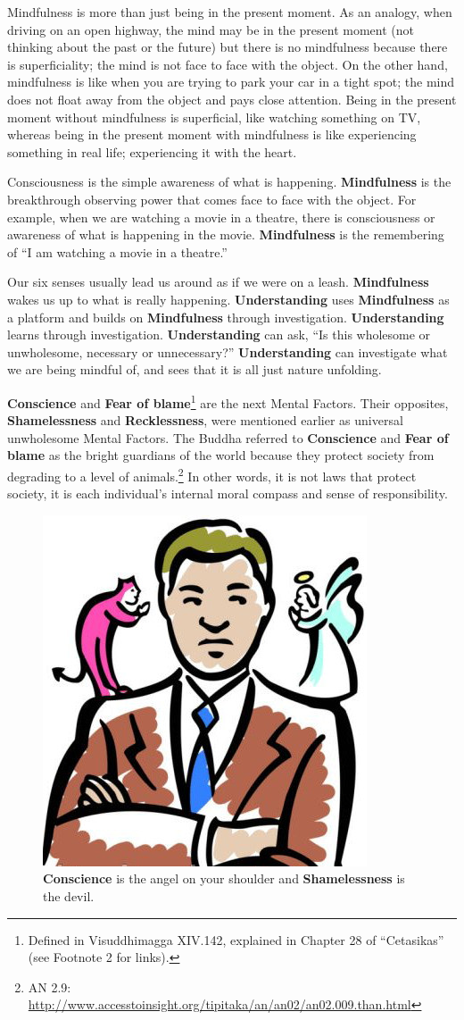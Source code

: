 Mindfulness is more than just being in the present moment. As an analogy, when driving on an open highway, the mind may be in the present moment (not thinking about the past or the future) but there is no mindfulness because there is superficiality; the mind is not face to face with the object. On the other hand, mindfulness is like when you are trying to park your car in a tight spot; the mind does not float away from the object and pays close attention. Being in the present moment without mindfulness is superficial, like watching something on TV, whereas being in the present moment with mindfulness is like experiencing something in real life; experiencing it with the heart.

Consciousness is the simple awareness of what is happening. \textbf{Mindfulness} is the breakthrough observing power that comes face to face with the object. For example, when we are watching a movie in a theatre, there is consciousness or awareness of what is happening in the movie. \textbf{Mindfulness} is the remembering of “I am watching a movie in a theatre.” 

Our six senses usually lead us around as if we were on a leash. \textbf{Mindfulness} wakes us up to what is really happening. \textbf{Understanding} uses \textbf{Mindfulness} as a platform and builds on \textbf{Mindfulness} through investigation. \textbf{Understanding} learns through investigation. \textbf{Understanding} can ask, “Is this wholesome or unwholesome, necessary or unnecessary?” \textbf{Understanding} can investigate what we are being mindful of, and sees that it is all just nature unfolding.

\textbf{Conscience} and \textbf{Fear of blame}\footnote{Defined in Visuddhimagga XIV.142, explained in Chapter 28 of “Cetasikas” (see Footnote 2 for links).} are the next Mental Factors. Their opposites, \textbf{Shamelessness} and \textbf{Recklessness}, were mentioned earlier as universal unwholesome Mental Factors. The Buddha referred to \textbf{Conscience} and \textbf{Fear of blame} as the bright guardians of the world because they protect society from degrading to a level of animals.\footnote{AN 2.9: \url{http://www.accesstoinsight.org/tipitaka/an/an02/an02.009.than.html}} In other words, it is not laws that protect society, it is each individual’s internal moral compass and sense of responsibility.

\begin{figure}[H]
\centering
\includegraphics[width=0.3\linewidth]{./Diagrams/AngelDevil}
\caption{\textbf{Conscience} is the angel on your shoulder and \textbf{Shamelessness} is the devil.}
\label{fig:AngelDevil}
\end{figure}

